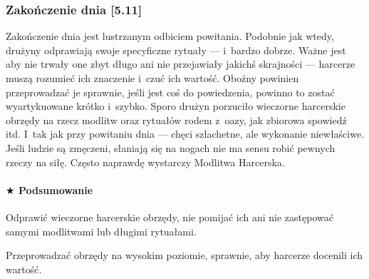 \documentclass[a5paper,10pt,titlepage,twoside]{article}
\newcommand*{\thecheckbox}{\hss$\Box$} %
\newenvironment*{checklist}
{\list{}{%
\renewcommand*{\makelabel}[1]{\thecheckbox}}}
{\endlist}
\begin{document}
\subsubsection{Zakończenie dnia [5.11]}
Zakończenie dnia jest lustrzanym odbiciem powitania. Podobnie jak wtedy, drużyny odprawiają swoje specyficzne rytuały --- i~bardzo dobrze. Ważne jest aby nie trwały one zbyt długo ani nie przejawiały jakichś skrajności --- harcerze muszą rozumieć ich znaczenie i~czuć ich wartość. Oboźny powinien przeprowadzać je sprawnie, jeśli jest coś do powiedzenia, powinno to zostać wyartykuowane krótko i~szybko. Sporo drużyn porzuciło wieczorne harcerskie obrzędy na rzecz modlitw oraz rytuałów rodem z~oazy, jak zbiorowa spowiedź itd. I~tak jak przy powitaniu dnia --- chęci szlachetne, ale wykonanie niewłaściwe. Jeśli ludzie są zmęczeni, słaniają się na nogach nie ma sensu robić pewnych rzeczy na siłę. Często naprawdę wystarczy Modlitwa Harcerska.
\paragraph{$\bigstar$ Podsumowanie}
\begin{checklist}
\item Odprawić wieczorne harcerskie obrzędy, nie pomijać ich ani nie zastępować samymi modlitwami lub długimi rytuałami.
\item Przeprowadzać obrzędy na wysokim poziomie, sprawnie, aby harcerze docenili ich wartość.
\end{checklist}
\end{document}
